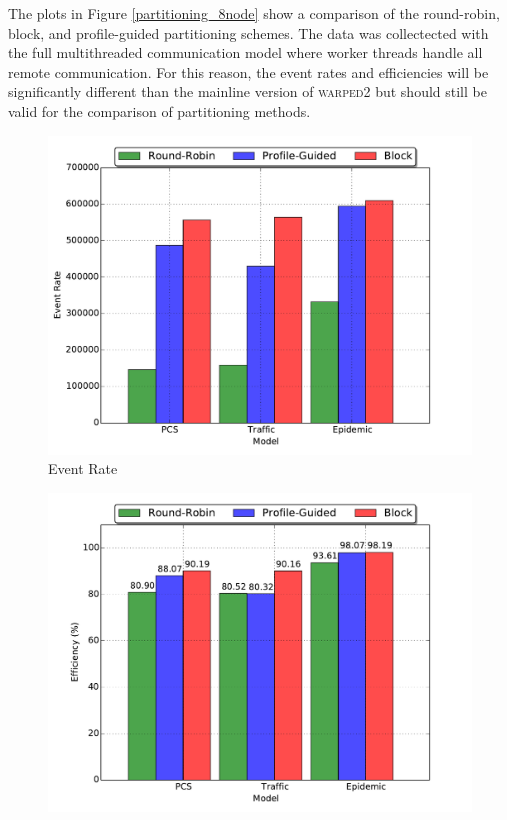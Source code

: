 \documentclass[11pt]{book}
\begin{document}
The plots in Figure \ref{partitioning_8node} show a comparison of the round-robin, block, and
profile-guided partitioning schemes.  The data was collectected with the full multithreaded
communication model where worker threads handle all remote communication.  For this reason, the
event rates and efficiencies will be significantly different than the mainline version of
\textsc{warped2} but should still be valid for the comparison of partitioning methods.

\begin{figure}
  \begin{minipage}{.5\textwidth}
    \begin{center}
      \includegraphics[width=\textwidth,keepaspectratio,quiet]{figs/partitioning_communication/partitioning_eventrate_8node.pdf} \\
      Event Rate \\
    \end{center}
  \end{minipage}%
  \hfill
  \begin{minipage}{.5\textwidth}
    \begin{center}
      \includegraphics[width=\textwidth,keepaspectratio,quiet]{figs/partitioning_communication/partitioning_efficiency_8node.pdf} \\

\end{center}
\end{minipage}
\end{figure}
\end{document}
